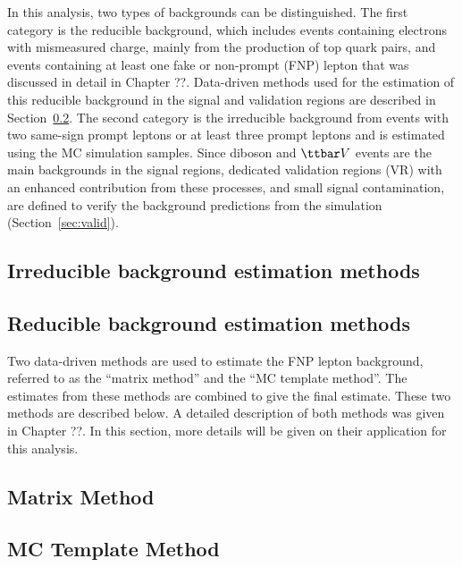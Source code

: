 In this analysis, two types of backgrounds can be distinguished.
 The first category is the reducible  
background, which includes events containing electrons with mismeasured charge, mainly from the production of top quark pairs, 
and events containing at least one fake or non-prompt (FNP) lepton that 
was discussed in detail in Chapter ??.
Data-driven methods used for the estimation of this reducible background  in the signal 
and validation regions are described in Section~\ref{sec:DD_bkg}. The second category is the irreducible background from events with two same-sign prompt 
leptons or at least three prompt leptons and is estimated using the MC simulation samples. Since diboson and $\ttbar V$ events are the main 
backgrounds in the signal regions, dedicated validation regions (VR) with an enhanced contribution from these processes, and small 
signal contamination, are defined to verify the background predictions from the simulation (Section~\ref{sec:valid}). 


\subsection{Irreducible background estimation methods} 
\label{sec:DD_bkg}



\subsection{Reducible background estimation methods} 
\label{sec:DD_bkg}


Two data-driven methods are used to estimate the FNP lepton background, referred to as the ``matrix method'' and the ``MC template method''. 
The estimates from these methods are combined to give the final estimate. These two methods are described below. 
A detailed description of both methods was given in Chapter ??. 
In this section, more details will be given on their application for this 
analysis.



\subsection{Matrix Method}


\subsection{MC Template Method}



